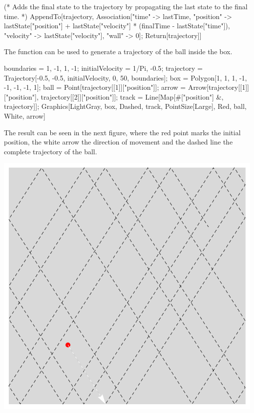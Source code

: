 \documentclass{tstextbook}
\begin{document}
\begin{example}
\begin{mathematica}
   (* Adds the final state to the trajectory by propagating the last state
      to the final time. *)
   AppendTo[trajectory,
            Association["time" -> lastTime,
                        "position" -> lastState["position"] +
                        lastState["velocity"] *
                        (finalTime - lastState["time"]), 
                        "velocity" -> lastState["velocity"],
                        "wall" -> 0]; 
   Return[trajectory]]
\end{mathematica}
The function can be used to generate a trajectory of the ball inside the box.
\begin{mathematica}
boundaries = {1, -1, 1, -1};
initialVelocity = {1/Pi, -0.5};
trajectory = Trajectory[{-0.5, -0.5}, initialVelocity, 0, 50, boundaries];
box = Polygon[{{1, 1}, {1, -1}, {-1, -1}, {-1, 1}}];
ball = Point[trajectory[[1]]["position"]];
arrow = Arrow[{trajectory[[1]]["position"], trajectory[[2]]["position"]}];
track = Line[Map[#["position"] &, trajectory]];
Graphics[{{LightGray, box},
          {Dashed, track},
          {PointSize[Large], Red, ball},
          {White, arrow}}]
\end{mathematica}
The result can be seen in the next figure, where the red point marks the initial position, the white arrow the direction of movement and the dashed line the complete trajectory of the ball. 

\includegraphics[scale=0.5, center]{images/ball_trajectory.pdf}


\end{example}
\end{document}
